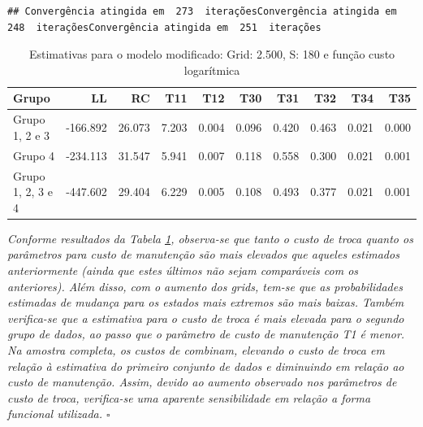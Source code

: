 \documentclass[12pt,a4paper]{article}
\newenvironment{Shaded}{\begin{snugshade}}{\end{snugshade}}
\newcommand{\DataTypeTok}[1]{\textcolor[rgb]{0.13,0.29,0.53}{#1}}
\newcommand{\DecValTok}[1]{\textcolor[rgb]{0.00,0.00,0.81}{#1}}
\newcommand{\KeywordTok}[1]{\textcolor[rgb]{0.13,0.29,0.53}{\textbf{#1}}}
\newcommand{\NormalTok}[1]{#1}
\newcommand{\OperatorTok}[1]{\textcolor[rgb]{0.81,0.36,0.00}{\textbf{#1}}}
\newcommand{\OtherTok}[1]{\textcolor[rgb]{0.56,0.35,0.01}{#1}}
\newcommand{\StringTok}[1]{\textcolor[rgb]{0.31,0.60,0.02}{#1}}
\begin{document}
\begin{verbatim}
## Convergência atingida em  273  iteraçõesConvergência atingida em  248  iteraçõesConvergência atingida em  251  iterações
\end{verbatim}

\begin{Shaded}
\end{Shaded}

\begin{table}[ht]
\centering
\begin{tabular}{lrrrrrrrrr}
  \hline
Grupo & LL & RC & T11 & T12 & T30 & T31 & T32 & T34 & T35 \\ 
  \hline
Grupo 1, 2 e 3 & -166.892 & 26.073 & 7.203 & 0.004 & 0.096 & 0.420 & 0.463 & 0.021 & 0.000 \\ 
  Grupo 4 & -234.113 & 31.547 & 5.941 & 0.007 & 0.118 & 0.558 & 0.300 & 0.021 & 0.001 \\ 
  Grupo 1, 2, 3 e 4 & -447.602 & 29.404 & 6.229 & 0.005 & 0.108 & 0.493 & 0.377 & 0.021 & 0.001 \\ 
   \hline
\end{tabular}
\caption{Estimativas para o modelo modificado: 
                 Grid: 2.500, S: 180 e função custo logarítmica} 
\label{tab:4}
\end{table}

\emph{Conforme resultados da Tabela \ref{tab:4}, observa-se que tanto o
custo de troca quanto os parâmetros para custo de manutenção são mais
elevados que aqueles estimados anteriormente (ainda que estes últimos
não sejam comparáveis com os anteriores). Além disso, com o aumento dos
grids, tem-se que as probabilidades estimadas de mudança para os estados
mais extremos são mais baixas. Também verifica-se que a estimativa para
o custo de troca é mais elevada para o segundo grupo de dados, ao passo
que o parâmetro de custo de manutenção T1 é menor. Na amostra completa,
os custos de combinam, elevando o custo de troca em relação à estimativa
do primeiro conjunto de dados e diminuindo em relação ao custo de
manutenção. Assim, devido ao aumento observado nos parâmetros de custo
de troca, verifica-se uma aparente sensibilidade em relação a forma
funcional utilizada. \(\square\)}
\end{document}

